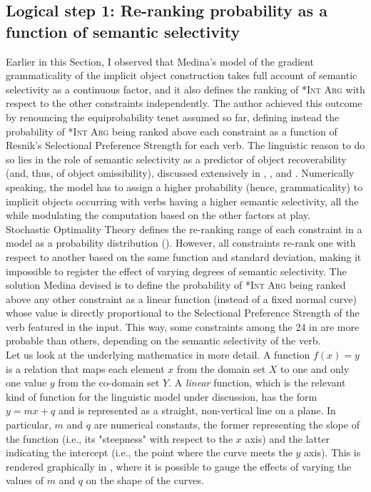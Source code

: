 \subsection{Logical step 1: Re-ranking probability as a function of semantic selectivity} Earlier in this Section, I observed that Medina's model of the gradient grammaticality of the implicit object construction takes full account of semantic selectivity as a continuous factor, and it also defines the ranking of \textsc{*Int Arg} with respect to the other constraints independently. The author achieved this outcome by renouncing the equiprobability tenet assumed so far, defining instead the probability of \textsc{*Int Arg} being ranked above each constraint as a function of Resnik's Selectional Preference Strength \parencite{Resnik1993,Resnik1996} for each verb. The linguistic reason to do so lies in the role of semantic selectivity as a predictor of object recoverability (and, thus, of object omissibility), discussed extensively in , , and . Numerically speaking, the model has to assign a higher probability (hence, grammaticality) to implicit objects occurring with verbs having a higher semantic selectivity, all the while modulating the computation based on the other factors at play.\\
Stochastic Optimality Theory defines the re-ranking range of each constraint in a model as a probability distribution (). However, all constraints re-rank one with respect to another based on the same function and standard deviation, making it impossible to register the effect of varying degrees of semantic selectivity. The solution Medina devised \parencite[94]{Medina2007} is to define the
probability of \textsc{*Int Arg} being ranked above any other constraint as a linear function (instead of a fixed normal curve) whose value is directly proportional to the Selectional Preference Strength of the verb featured in the input. This way, some constraints among the 24 in  are more probable than others, depending on the semantic selectivity of the verb.\\
Let us look at the underlying mathematics in more detail. A function $f(x) = y$ is a relation that maps each element $x$ from the domain set $X$ to one and only one value $y$ from the co-domain set $Y$. A \textit{linear} function, which is the relevant kind of function for the linguistic model under discussion, has the form $y = mx + q$ and is represented as a straight, non-vertical line on a plane. In particular, $m$ and $q$ are numerical constants, the former representing the slope of the function (i.e., its "steepness" with respect to the $x$ axis) and the latter indicating the intercept (i.e., the point where the curve meets the $y$ axis). This is rendered graphically in , where it is possible to gauge the effects of varying the values of $m$ and $q$ on the shape of the curves.

